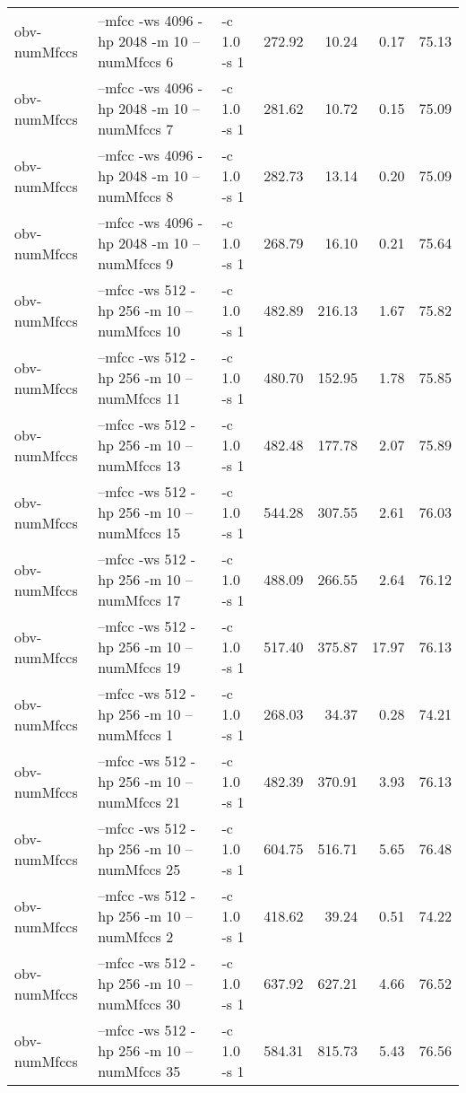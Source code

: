 \documentclass[11pt,a4paper]{article}
\begin{document}
\begin{tabular}{lllrrrr}
 obv-numMfccs  &  --mfcc -ws 4096 -hp 2048 -m 10 --numMfccs 6    &  -c 1.0 -s 1  &  272.92  &    10.24  &   0.17  &  75.13  \\
 obv-numMfccs  &  --mfcc -ws 4096 -hp 2048 -m 10 --numMfccs 7    &  -c 1.0 -s 1  &  281.62  &    10.72  &   0.15  &  75.09  \\
 obv-numMfccs  &  --mfcc -ws 4096 -hp 2048 -m 10 --numMfccs 8    &  -c 1.0 -s 1  &  282.73  &    13.14  &   0.20  &  75.09  \\
 obv-numMfccs  &  --mfcc -ws 4096 -hp 2048 -m 10 --numMfccs 9    &  -c 1.0 -s 1  &  268.79  &    16.10  &   0.21  &  75.64  \\
 obv-numMfccs  &  --mfcc -ws 512 -hp 256 -m 10 --numMfccs 10     &  -c 1.0 -s 1  &  482.89  &   216.13  &   1.67  &  75.82  \\
 obv-numMfccs  &  --mfcc -ws 512 -hp 256 -m 10 --numMfccs 11     &  -c 1.0 -s 1  &  480.70  &   152.95  &   1.78  &  75.85  \\
 obv-numMfccs  &  --mfcc -ws 512 -hp 256 -m 10 --numMfccs 13     &  -c 1.0 -s 1  &  482.48  &   177.78  &   2.07  &  75.89  \\
 obv-numMfccs  &  --mfcc -ws 512 -hp 256 -m 10 --numMfccs 15     &  -c 1.0 -s 1  &  544.28  &   307.55  &   2.61  &  76.03  \\
 obv-numMfccs  &  --mfcc -ws 512 -hp 256 -m 10 --numMfccs 17     &  -c 1.0 -s 1  &  488.09  &   266.55  &   2.64  &  76.12  \\
 obv-numMfccs  &  --mfcc -ws 512 -hp 256 -m 10 --numMfccs 19     &  -c 1.0 -s 1  &  517.40  &   375.87  &  17.97  &  76.13  \\
 obv-numMfccs  &  --mfcc -ws 512 -hp 256 -m 10 --numMfccs 1      &  -c 1.0 -s 1  &  268.03  &    34.37  &   0.28  &  74.21  \\
 obv-numMfccs  &  --mfcc -ws 512 -hp 256 -m 10 --numMfccs 21     &  -c 1.0 -s 1  &  482.39  &   370.91  &   3.93  &  76.13  \\
 obv-numMfccs  &  --mfcc -ws 512 -hp 256 -m 10 --numMfccs 25     &  -c 1.0 -s 1  &  604.75  &   516.71  &   5.65  &  76.48  \\
 obv-numMfccs  &  --mfcc -ws 512 -hp 256 -m 10 --numMfccs 2      &  -c 1.0 -s 1  &  418.62  &    39.24  &   0.51  &  74.22  \\
 obv-numMfccs  &  --mfcc -ws 512 -hp 256 -m 10 --numMfccs 30     &  -c 1.0 -s 1  &  637.92  &   627.21  &   4.66  &  76.52  \\
 obv-numMfccs  &  --mfcc -ws 512 -hp 256 -m 10 --numMfccs 35     &  -c 1.0 -s 1  &  584.31  &   815.73  &   5.43  &  76.56  \\

\end{tabular}
\end{document}
